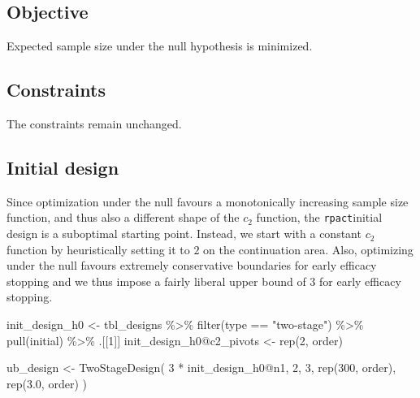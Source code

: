 \documentclass[
]{book}
\newenvironment{Shaded}{\begin{snugshade}}{\end{snugshade}}
\newcommand{\DecValTok}[1]{\textcolor[rgb]{0.00,0.00,0.81}{#1}}
\newcommand{\FloatTok}[1]{\textcolor[rgb]{0.00,0.00,0.81}{#1}}
\newcommand{\FunctionTok}[1]{\textcolor[rgb]{0.00,0.00,0.00}{#1}}
\newcommand{\NormalTok}[1]{#1}
\newcommand{\OtherTok}[1]{\textcolor[rgb]{0.56,0.35,0.01}{#1}}
\newcommand{\SpecialCharTok}[1]{\textcolor[rgb]{0.00,0.00,0.00}{#1}}
\newcommand{\StringTok}[1]{\textcolor[rgb]{0.31,0.60,0.02}{#1}}
\begin{document}
\hypertarget{objective-15}{%
\subsection{Objective}\label{objective-15}}

Expected sample size under the null hypothesis is minimized.

\hypertarget{constraints-15}{%
\subsection{Constraints}\label{constraints-15}}

The constraints remain unchanged.

\hypertarget{initial-design-12}{%
\subsection{Initial design}\label{initial-design-12}}

Since optimization under the null favours a monotonically increasing sample size function, and thus also a different shape of the \(c_2\) function, the \texttt{rpact}initial design is a suboptimal starting point. Instead, we start with a constant \(c_2\) function by heuristically setting it to \(2\) on the continuation area. Also, optimizing under the null favours extremely conservative boundaries for early efficacy stopping and we thus impose a fairly liberal upper bound of \(3\) for early efficacy stopping.

\begin{Shaded}
\begin{Highlighting}[]
\NormalTok{init\_design\_h0 }\OtherTok{\textless{}{-}}\NormalTok{ tbl\_designs }\SpecialCharTok{\%\textgreater{}\%} 
    \FunctionTok{filter}\NormalTok{(type }\SpecialCharTok{==} \StringTok{"two{-}stage"}\NormalTok{) }\SpecialCharTok{\%\textgreater{}\%} 
    \FunctionTok{pull}\NormalTok{(initial) }\SpecialCharTok{\%\textgreater{}\%} 
\NormalTok{    .[[}\DecValTok{1}\NormalTok{]]}
\NormalTok{init\_design\_h0}\SpecialCharTok{@}\NormalTok{c2\_pivots }\OtherTok{\textless{}{-}} \FunctionTok{rep}\NormalTok{(}\DecValTok{2}\NormalTok{, order)}

\NormalTok{ub\_design }\OtherTok{\textless{}{-}} \FunctionTok{TwoStageDesign}\NormalTok{(}
    \DecValTok{3} \SpecialCharTok{*}\NormalTok{ init\_design\_h0}\SpecialCharTok{@}\NormalTok{n1,}
    \DecValTok{2}\NormalTok{,}
    \DecValTok{3}\NormalTok{,}
    \FunctionTok{rep}\NormalTok{(}\DecValTok{300}\NormalTok{, order),}
    \FunctionTok{rep}\NormalTok{(}\FloatTok{3.0}\NormalTok{, order)}
\NormalTok{)}
\end{Highlighting}
\end{Shaded}
\end{document}
